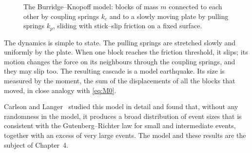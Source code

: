 \begin{figure}[t]
\centering
{}
\caption{The Burridge--Knopoff model: blocks of mass $m$ connected to each other by coupling springs
$k_c$ and to a slowly moving plate by pulling springs $k_p$, sliding with stick--slip friction on a
fixed surface.}
\label{fig:bk-sketch}
\end{figure}

The dynamics is simple to state. The pulling springs are stretched slowly and uniformly by the plate.
When one block reaches the friction threshold, it slips; its motion changes the force on its neighbours
through the coupling springs, and they may slip too. The resulting cascade is a model earthquake. Its
size is measured by the moment, the sum of the displacements of all the blocks that moved, in close
analogy with \cref{eq:M0}.

Carlson and Langer~\cite{CarlsonLanger1989} studied this model in detail and found that, without any
randomness in the model, it produces a broad distribution of event sizes that is consistent with the
Gutenberg--Richter law for small and intermediate events, together with an excess of very large
events. The model and these results are the subject of Chapter~4.

